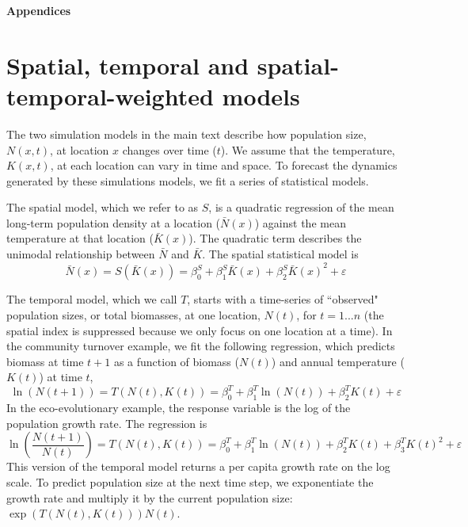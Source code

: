 \documentclass[11pt]{article}
\begin{document}

\clearpage 
\newpage 

\setcounter{page}{1}
\setcounter{equation}{0}
\setcounter{figure}{0}
\setcounter{section}{0}
\setcounter{table}{0}

\centerline{\Large \textbf{Appendices}}

\renewcommand{\thesection}{\Alph{section}}

\section{Spatial, temporal and spatial-temporal-weighted models}\label{models}

The two simulation models in the main text describe how population size, $N(x,t)$, at location $x$ changes over time ($t$). We assume that the temperature, $K(x,t)$, at each location can vary in time and space. To forecast the dynamics generated by these simulations models, we fit a series of statistical models.   

The spatial model, which we refer to as $S$, is a quadratic regression of the mean long-term population density at a location ($\bar{N}(x)$) against the mean temperature at that location ($\bar{K}(x)$).  The quadratic term describes the unimodal relationship between $\bar{N}$ and $\bar{K}$. The spatial statistical model is
\begin{equation}
\bar{N}(x) = S(\bar{K}(x)) = \beta^S_0 +  \beta^S_1 \bar{K}(x) +\beta^S_2 {\bar{K}(x)}^2 + \varepsilon
\label{eqn:spatial_regression}
\end{equation}

The temporal model, which we call $T$, starts with a time-series of ``observed" population sizes, or total biomasses, at one location, $N(t)$, for $t=1...n$ (the spatial index is suppressed because we only focus on one location at a time). In the community turnover example, we fit the following regression, which predicts biomass at time $t+1$ as a function of biomass ($N(t)$) and annual temperature ($K(t)$) at time $t$,
\begin{equation}
\ln(N(t+1)) = T(N(t),K(t)) = \beta^T_0 +  \beta^T_1 \ln(N(t)) +\beta^T_2 K(t)  +  \varepsilon
\label{eqn:temporal_regression_community1}
\end{equation}
In the eco-evolutionary example, the response variable is the log of the population growth rate. The regression is 
\begin{equation}
\ln\left(\frac{N(t+1)}{N(t)}\right) = T(N(t),K(t)) = \beta^T_0 +  \beta^T_1 \ln(N(t)) +\beta^T_2 K(t)  +\beta^T_3 K(t)^2 +  \varepsilon
\label{eqn:temporal_regression_ecoevo2}
\end{equation}
This version of the temporal model returns a per capita growth rate on the log scale. To predict population size at the next time step, we exponentiate the growth rate and multiply it by the current population size: $\exp(T(N(t),K(t))) N(t)$.
\end{document}
